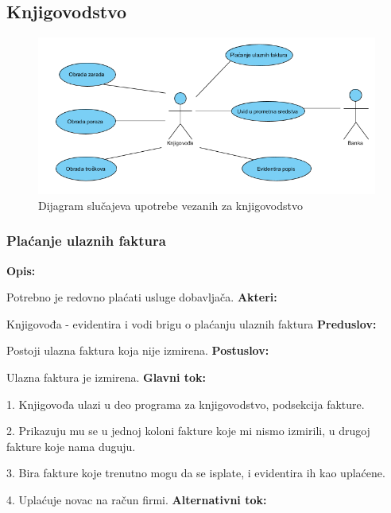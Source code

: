 \subsection{Knjigovodstvo}

\begin{figure}[ht]
\centering
\includegraphics[width=160mm]{slike/useCaseKnjigovodstvo.png}
\caption{Dijagram slučajeva upotrebe vezanih za knjigovodstvo}
\end{figure}

\clearpage

\subsubsection{Plaćanje ulaznih faktura}

\textbf{Opis:}

Potrebno je redovno plaćati usluge dobavljača.
\newline
\textbf{Akteri:}

Knjigovođa - evidentira i vodi brigu o plaćanju ulaznih faktura
\newline
\textbf{Preduslov:}

Postoji ulazna faktura koja nije izmirena.
\newline
\textbf{Postuslov:}

Ulazna faktura je izmirena.
\newline
\textbf{Glavni tok:}

1. Knjigovođa ulazi u deo programa za knjigovodstvo, podsekcija fakture.

2. Prikazuju mu se u jednoj koloni fakture koje mi nismo izmirili, u drugoj fakture koje nama duguju.

3. Bira fakture koje trenutno mogu da se isplate, i evidentira ih kao uplaćene.

4. Uplaćuje novac na račun firmi.
\newline
\textbf{Alternativni tok:}

